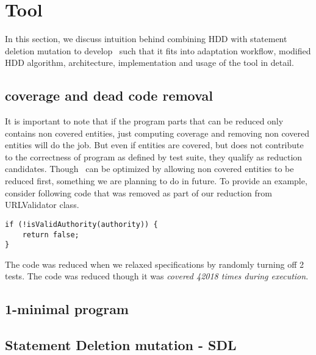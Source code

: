 
\section{Tool}
\label{sec:experiments}

In this section, we discuss intuition behind combining HDD with statement deletion mutation to develop \mytool\  such that it fits into adaptation workflow, modified HDD algorithm, architecture, implementation and usage of the tool in detail.       

\subsection{coverage and dead code removal}
It is important to note that if the program parts that can be reduced only contains non covered entities, just computing coverage and removing non covered entities will do the job. But even if entities are covered, but does not contribute to the correctness of program as defined by test suite, they qualify as reduction candidates. Though \mytool\ can be optimized by allowing non covered entities to be reduced first, something we are planning to do in future. To provide an example, consider following code that was removed as part of our reduction from URLValidator class.

\begin{lstlisting}[caption={URLValidator reduced code}]
if (!isValidAuthority(authority)) {
	return false;
}
\end{lstlisting}

The code was reduced when we relaxed specifications by randomly turning off 2 tests. The code was reduced though it was \emph{covered 42018 times during execution}. 



\subsection{1-minimal program}
\label{sec:opensource}


\subsection{Statement Deletion mutation - SDL}
\label{sec:sdl}



